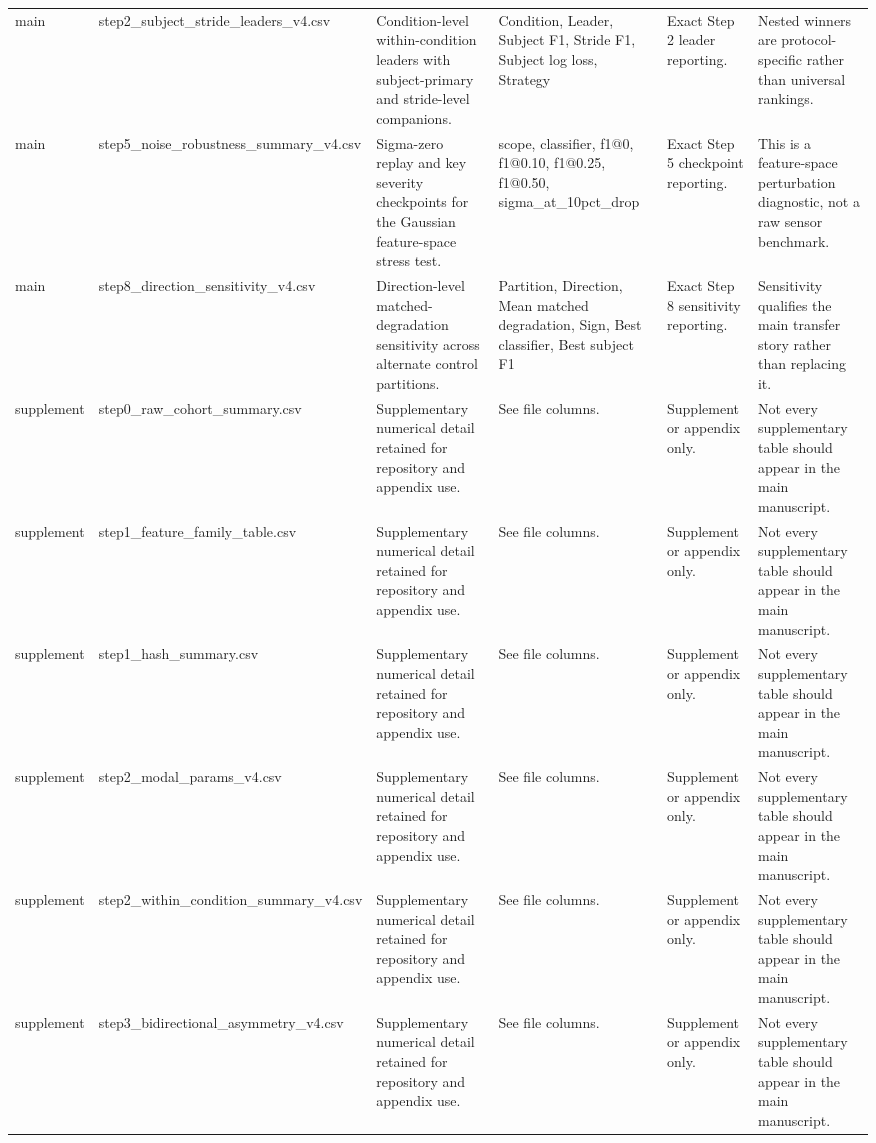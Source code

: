\begin{longtable}{llllll}
main & step2_subject_stride_leaders_v4.csv & Condition-level within-condition leaders with subject-primary and stride-level companions. & Condition, Leader, Subject F1, Stride F1, Subject log loss, Strategy & Exact Step 2 leader reporting. & Nested winners are protocol-specific rather than universal rankings. \\
main & step5_noise_robustness_summary_v4.csv & Sigma-zero replay and key severity checkpoints for the Gaussian feature-space stress test. & scope, classifier, f1@0, f1@0.10, f1@0.25, f1@0.50, sigma_at_10pct_drop & Exact Step 5 checkpoint reporting. & This is a feature-space perturbation diagnostic, not a raw sensor benchmark. \\
main & step8_direction_sensitivity_v4.csv & Direction-level matched-degradation sensitivity across alternate control partitions. & Partition, Direction, Mean matched degradation, Sign, Best classifier, Best subject F1 & Exact Step 8 sensitivity reporting. & Sensitivity qualifies the main transfer story rather than replacing it. \\
supplement & step0_raw_cohort_summary.csv & Supplementary numerical detail retained for repository and appendix use. & See file columns. & Supplement or appendix only. & Not every supplementary table should appear in the main manuscript. \\
supplement & step1_feature_family_table.csv & Supplementary numerical detail retained for repository and appendix use. & See file columns. & Supplement or appendix only. & Not every supplementary table should appear in the main manuscript. \\
supplement & step1_hash_summary.csv & Supplementary numerical detail retained for repository and appendix use. & See file columns. & Supplement or appendix only. & Not every supplementary table should appear in the main manuscript. \\
supplement & step2_modal_params_v4.csv & Supplementary numerical detail retained for repository and appendix use. & See file columns. & Supplement or appendix only. & Not every supplementary table should appear in the main manuscript. \\
supplement & step2_within_condition_summary_v4.csv & Supplementary numerical detail retained for repository and appendix use. & See file columns. & Supplement or appendix only. & Not every supplementary table should appear in the main manuscript. \\
supplement & step3_bidirectional_asymmetry_v4.csv & Supplementary numerical detail retained for repository and appendix use. & See file columns. & Supplement or appendix only. & Not every supplementary table should appear in the main manuscript. \\

\end{longtable}
